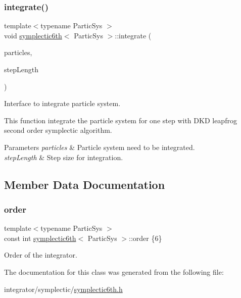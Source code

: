 \subsubsection{\texorpdfstring{integrate()}{integrate()}}
{\footnotesize\ttfamily template$<$typename Partic\+Sys $>$ \\
void \mbox{\hyperlink{classsymplectic6th}{symplectic6th}}$<$ Partic\+Sys $>$\+::integrate (\begin{DoxyParamCaption}\item[{Partic\+Sys \&}]{particles,  }\item[{\mbox{\hyperlink{classsymplectic6th_a1059d63d55058db7c6ab5b71e097f3ee}{Scalar}}}]{step\+Length }\end{DoxyParamCaption})}



Interface to integrate particle system. 

This function integrate the particle system for one step with D\+KD leapfrog second order symplectic algorithm. 
\begin{DoxyParams}{Parameters}
{\em particles} & Particle system need to be integrated. \\
\hline
{\em step\+Length} & Step size for integration. \\
\hline
\end{DoxyParams}


\subsection{Member Data Documentation}
\mbox{\label{classsymplectic6th_a7f4232a8639d27aeb0890476176e8553}} 
\subsubsection{\texorpdfstring{order}{order}}
{\footnotesize\ttfamily template$<$typename Partic\+Sys $>$ \\
const int \mbox{\hyperlink{classsymplectic6th}{symplectic6th}}$<$ Partic\+Sys $>$\+::order \{6\}\hspace{0.3cm}{\ttfamily [static]}}



Order of the integrator. 



The documentation for this class was generated from the following file\+:\begin{DoxyCompactItemize}
\item 
integrator/symplectic/\mbox{\hyperlink{symplectic6th_8h}{symplectic6th.\+h}}\end{DoxyCompactItemize}
